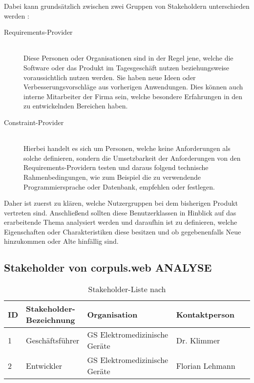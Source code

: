 Dabei kann grundsätzlich zwischen zwei Gruppen von Stakeholdern unterschieden werden \cite{Leffingwell.2011}:
\begin{description}
\item [Requirements-Provider] \hfill \\
Diese Personen oder Organisationen sind in der Regel jene, welche die Software oder das Produkt im Tagesgeschäft nutzen beziehungsweise voraussichtlich nutzen werden.
Sie haben neue Ideen oder Verbesserungsvorschläge aus vorherigen Anwendungen.
Dies können auch interne Mitarbeiter der Firma sein, welche besondere Erfahrungen in den zu entwickelnden Bereichen haben. %
\item [Constraint-Provider] \hfill \\
Hierbei handelt es sich um Personen, welche keine Anforderungen als solche definieren, sondern die Umsetzbarkeit der Anforderungen von den Requirements-Providern testen und daraus folgend technische Rahmenbedingungen, wie zum Beispiel die zu verwendende  Programmiersprache oder Datenbank, empfehlen oder festlegen.
\end{description}

Daher ist zuerst zu klären, welche Nutzergruppen bei dem bisherigen Produkt vertreten sind.
Anschließend sollten diese Benutzerklassen in Hinblick auf das erarbeitende Thema analysiert werden und daraufhin ist zu definieren, welche Eigenschaften oder Charakteristiken diese besitzen und ob gegebenenfalls Neue hinzukommen oder Alte hinfällig sind. 

\subsection{Stakeholder von corpuls.web ANALYSE}

\begin{table}
\centering
\setlength{\extrarowheight}{4pt}
\begin{tabular}{ | p{0.05\linewidth} | p{0.2\linewidth} | p{0.4\linewidth} | p{0.35\linewidth} |}
  \hline
  \textbf{ID} & \textbf{Stakeholder-Bezeichnung} & \textbf{Organisation} & \textbf{Kontaktperson}
  \\\hline
  1			& Geschäftsführer & GS Elektromedizinische Geräte & Dr. Klimmer
  \\\hline  
  2			& Entwickler & GS Elektromedizinische Geräte & Florian Lehmann
  \\\hline
\end{tabular} 
  \caption[Stakeholder-Liste]{Stakeholder-Liste nach \cite[S. 85]{Bergsmann.2018}}
  \label{tbl:Stakeholder-Liste}
\end{table}



